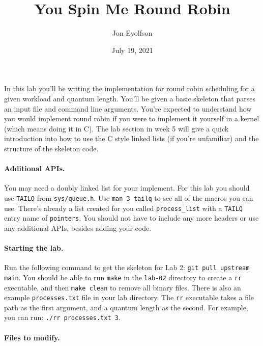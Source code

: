 

\title{You Spin Me Round Robin}
\author{Jon Eyolfson}
\date{July 19, 2021}



\maketitle

In this lab you'll be writing the implementation for round robin scheduling
for a given workload and quantum length.
You'll be given a basic skeleton that parses an input file and command line
arguments.
You're expected to understand how you would implement round robin if you were
to implement it yourself in a kernel (which means doing it in C).
The lab section in week 5 will give a quick introduction into how to use the
C style linked lists (if you're unfamiliar) and the structure of the skeleton
code.

\paragraph{Additional APIs.}

You may need a doubly linked list for your implement.
For this lab you should use \texttt{TAILQ} from \texttt{sys/queue.h}.
Use \texttt{man 3 tailq} to see all of the macros you can use.
There's already a list created for you called \texttt{process\_list} with a
\texttt{TAILQ} entry name of \texttt{pointers}.
You should not have to include any more headers or use any additional APIs,
besides adding your code.

\paragraph{Starting the lab.}

Run the following command to get the skeleton for Lab 2:
\texttt{git pull upstream main}.
You should be able to run \texttt{make} in the \texttt{lab-02} directory to
create a \texttt{rr} executable, and then \texttt{make clean} to remove all
binary files.
There is also an example \texttt{processes.txt} file in your lab directory.
The \texttt{rr} executable takes a file path as the first argument, and a
quantum length as the second.
For example, you can run: \texttt{./rr processes.txt 3}.

\paragraph{Files to modify.}

